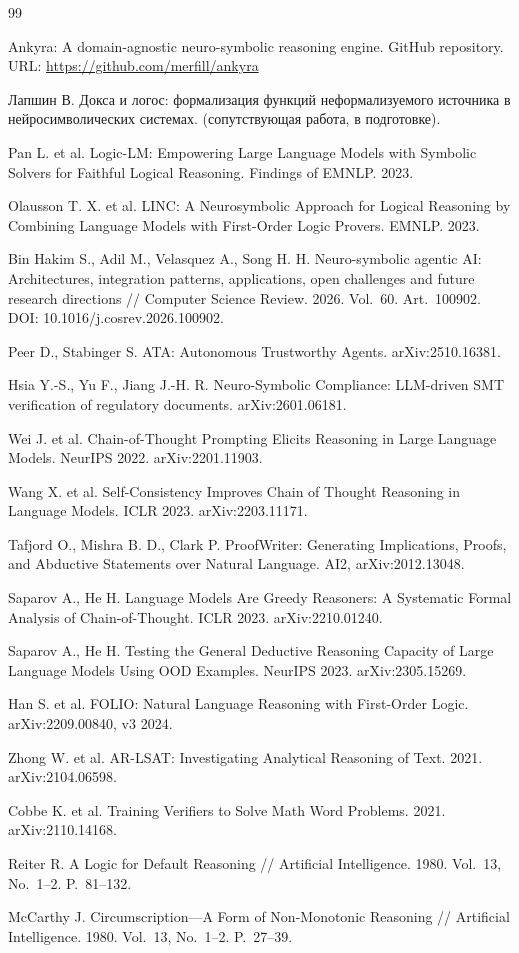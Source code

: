 \documentclass[11pt,a4paper]{article}
\begin{document}
\begin{thebibliography}{99}

	 Ankyra: A domain-agnostic neuro-symbolic reasoning engine. GitHub repository. URL: \url{https://github.com/merfill/ankyra}

	 Лапшин В. Докса и логос: формализация функций неформализуемого источника в нейросимволических системах. (сопутствующая работа, в подготовке).

	 Pan L. et al. Logic-LM: Empowering Large Language Models with Symbolic Solvers for Faithful Logical Reasoning. Findings of EMNLP. 2023.

	 Olausson T. X. et al. LINC: A Neurosymbolic Approach for Logical Reasoning by Combining Language Models with First-Order Logic Provers. EMNLP. 2023.

	 Bin Hakim S., Adil M., Velasquez A., Song H. H. Neuro-symbolic agentic AI: Architectures, integration patterns, applications, open challenges and future research directions // Computer Science Review. 2026. Vol.~60. Art.~100902. DOI: 10.1016/j.cosrev.2026.100902.

 Peer D., Stabinger S. ATA: Autonomous Trustworthy Agents. arXiv:2510.16381.

	 Hsia Y.-S., Yu F., Jiang J.-H. R. Neuro-Symbolic Compliance: LLM-driven SMT verification of regulatory documents. arXiv:2601.06181.

	 Wei J. et al. Chain-of-Thought Prompting Elicits Reasoning in Large Language Models. NeurIPS 2022. arXiv:2201.11903.

	 Wang X. et al. Self-Consistency Improves Chain of Thought Reasoning in Language Models. ICLR 2023. arXiv:2203.11171.

	 Tafjord O., Mishra B. D., Clark P. ProofWriter: Generating Implications, Proofs, and Abductive Statements over Natural Language. AI2, arXiv:2012.13048.

	 Saparov A., He H. Language Models Are Greedy Reasoners: A Systematic Formal Analysis of Chain-of-Thought. ICLR 2023. arXiv:2210.01240.

	 Saparov A., He H. Testing the General Deductive Reasoning Capacity of Large Language Models Using OOD Examples. NeurIPS 2023. arXiv:2305.15269.

	 Han S. et al. FOLIO: Natural Language Reasoning with First-Order Logic. arXiv:2209.00840, v3 2024.

	 Zhong W. et al. AR-LSAT: Investigating Analytical Reasoning of Text. 2021. arXiv:2104.06598.

	 Cobbe K. et al. Training Verifiers to Solve Math Word Problems. 2021. arXiv:2110.14168.

	 Reiter R. A Logic for Default Reasoning // Artificial Intelligence. 1980. Vol.~13, No.~1--2. P.~81--132.

	 McCarthy J. Circumscription---A Form of Non-Monotonic Reasoning // Artificial Intelligence. 1980. Vol.~13, No.~1--2. P.~27--39.

	\end{thebibliography}
\end{document}
